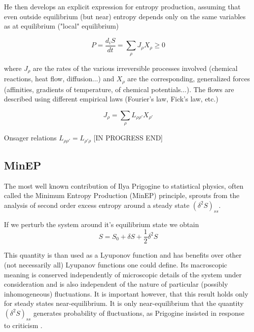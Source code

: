\documentclass[a4paper,12pt]{article}
\begin{document}
He then develops an explicit expression for entropy production, assuming that even outside equilibrium (but near) entropy depends only on the same
variables as at equilibrium ("local" equilibrium)

\begin{displaymath}
	P=\frac{d_iS}{dt}=\sum _{\rho } J_{\rho }X_{\rho }\geq 0
\end{displaymath}


where \(J_{\rho }\) are the rates of the various irreversible processes involved (chemical reactions, heat flow, diffusion$\ldots $) and \(X_{\rho
}\) are the corresponding, generalized forces (affinities, gradients of temperature, of chemical potentials$\ldots $). The flows are described using
different empirical laws (Fourier{'}s law, Fick{'}s law, etc.) 

\begin{displaymath}
	J_{\rho }=\sum _{\rho } L_{\rho \rho '}X_{\rho '}
\end{displaymath}

Onsager relations \(L_{\rho \rho '}=L_{\rho '\rho }\)
[IN PROGRESS END]

\subsection{MinEP}

The most well known contribution of Ilya Prigogine to statistical physics, often called the Minimum Entropy Production (MinEP) principle, sprouts from the analysis of second order excess entropy around a steady state $ (\delta^2 S)_{ss} $. 

If we perturb the system around it's equilibrium state we obtain
\begin{equation}
  S=S_0 + \delta S + \frac{1}{2}\delta^2 S
\end{equation}

This quantity is than used as a Lyuponov function and has benefits over other (not necessarily all) Lyupanov functions one could define. 
Its macroscopic meaning is conserved independently of microscopic details of the system under consideration and is also independent of the nature of particular (possibly inhomogeneous) fluctuations.
It is important however, that this result holds only for steady states near-equilibrium. It is only near-equilibrium that the quantity $ (\delta^2 S)_{ss} $ generates probability of fluctuations, as Prigogine insisted in response to criticism \cite{Nicolis:1979cv}. 
\end{document}
